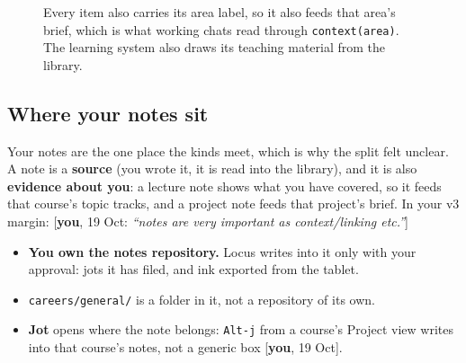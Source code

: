 \documentclass[10pt]{extarticle}
\newcommand{\you}[2]{{\small[\textbf{you}, #1: \textit{``#2''}]}}
\newcommand{\youx}[1]{{\small[\textbf{you}, #1]}}
\newcommand{\Sub}[1]{\subsection*{#1}}
\begin{document}
\begin{figure}[h]
\centering
{}
\par\medskip\begin{minipage}{0.9\linewidth}\small Every item also carries its area label, so it also feeds that area's brief, which is what working chats read through \texttt{context(area)}. The learning system also draws its teaching material from the library.\end{minipage}
\end{figure}

\Sub{Where your notes sit}
Your notes are the one place the kinds meet, which is why the split felt unclear. A note is a \textbf{source} (you wrote it, it is read into the library), and it is also \textbf{evidence about you}: a lecture note shows what you have covered, so it feeds that course's topic tracks, and a project note feeds that project's brief. In your v3 margin: \you{19 Oct}{notes are very important as context/linking etc.}

\begin{itemize}
\item \textbf{You own the notes repository.} Locus writes into it only with your approval: jots it has filed, and ink exported from the tablet.
\item \texttt{careers/general/} is a folder in it, not a repository of its own.
\item \textbf{Jot} opens where the note belongs: \texttt{Alt-j} from a course's Project view writes into that course's notes, not a generic box \youx{19 Oct}.
\end{itemize}
\end{document}
